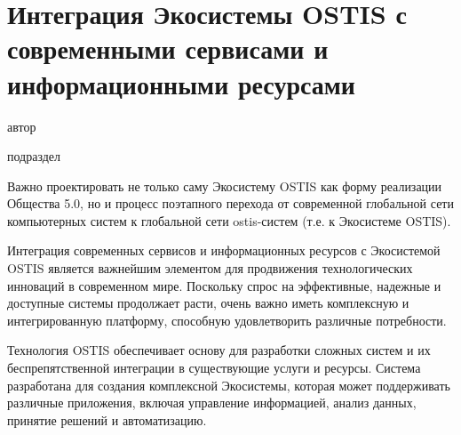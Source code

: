 \chapter{Интеграция Экосистемы OSTIS с современными сервисами и информационными ресурсами}
{\label{chapter_integration}}

\vspace{-7\baselineskip}

\begin{SCn}
\begin{scnrelfromlist}{автор}
\end{scnrelfromlist}

\bigskip


\bigskip

\begin{scnrelfromlist}{подраздел}
\end{scnrelfromlist}

\end{SCn}

Важно проектировать не только саму Экосистему OSTIS как форму реализации Общества 5.0, но и процесс поэтапного перехода от современной глобальной сети компьютерных систем к глобальной сети ostis-систем (т.е. к Экосистеме OSTIS).

Интеграция современных сервисов и информационных ресурсов с Экосистемой OSTIS является важнейшим элементом для продвижения технологических инноваций в современном мире. Поскольку спрос на эффективные, надежные и доступные системы продолжает расти, очень важно иметь комплексную и интегрированную платформу, способную удовлетворить различные потребности.

Технология OSTIS обеспечивает основу для разработки сложных систем и их беспрепятственной интеграции в существующие услуги и ресурсы. Система разработана для создания комплексной Экосистемы, которая может поддерживать различные приложения, включая управление информацией, анализ данных, принятие решений и автоматизацию.

